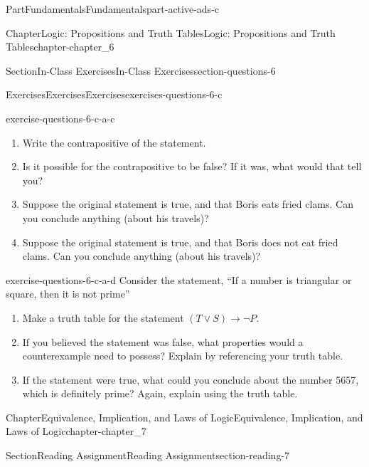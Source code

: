 \documentclass[oneside,10pt,]{book}
\numberwithin{equation}{section}
\begin{document}
\begin{partptx}{Part}{Fundamentals}{}{Fundamentals}{}{}{part-active-ads-c}
\begin{chapterptx}{Chapter}{Logic: Propositions and Truth Tables}{}{Logic: Propositions and Truth Tables}{}{}{chapter-chapter_6}
\begin{sectionptx}{Section}{In-Class Exercises}{}{In-Class Exercises}{}{}{section-questions-6}
\begin{exercises-subsection-numberless}{Exercises}{Exercises}{}{Exercises}{}{}{exercises-questions-6-c}
\begin{exercisegroup}
\begin{divisionexerciseeg}{3}{}{}{exercise-questions-6-c-a-c}
\begin{enumerate}[label=(\alph*)]
\item{}Write the contrapositive of the statement.%
\item{}Is it possible for the contrapositive to be false? If it was, what would that tell you?%
\item{}Suppose the original statement is true, and that Boris eats fried clams. Can you conclude anything (about his travels)?%
\item{}Suppose the original statement is true, and that Boris does not eat fried clams. Can you conclude anything (about his travels)?%
\end{enumerate}
%
\end{divisionexerciseeg}%
\begin{divisionexerciseeg}{4}{}{}{exercise-questions-6-c-a-d}%
Consider the statement, ``If a number is triangular or square, then it is not prime''%
\begin{enumerate}[label=(\alph*)]
\item{}Make a truth table for the statement \((T \vee S) \rightarrow \neg P\).%
\item{}If you believed the statement was false, what properties would a counterexample need to possess? Explain by referencing your truth table.%
\item{}If the statement were true, what could you conclude about the number 5657, which is definitely prime? Again, explain using the truth table.%
\end{enumerate}
%
\end{divisionexerciseeg}%
\end{exercisegroup}
\par\medskip\noindent
\end{exercises-subsection-numberless}
\end{sectionptx}
\end{chapterptx}
%
\typeout{************************************************}
\typeout{************************************************}
%
\begin{chapterptx}{Chapter}{Equivalence, Implication, and Laws of Logic}{}{Equivalence, Implication, and Laws of Logic}{}{}{chapter-chapter_7}
\renewcommand*{\chaptername}{Chapter}
%
%
%
%
%
\typeout{************************************************}
\typeout{************************************************}
%
\begin{sectionptx}{Section}{Reading Assignment}{}{Reading Assignment}{}{}{section-reading-7}

\end{sectionptx}
\end{chapterptx}
\end{partptx}
\end{document}
